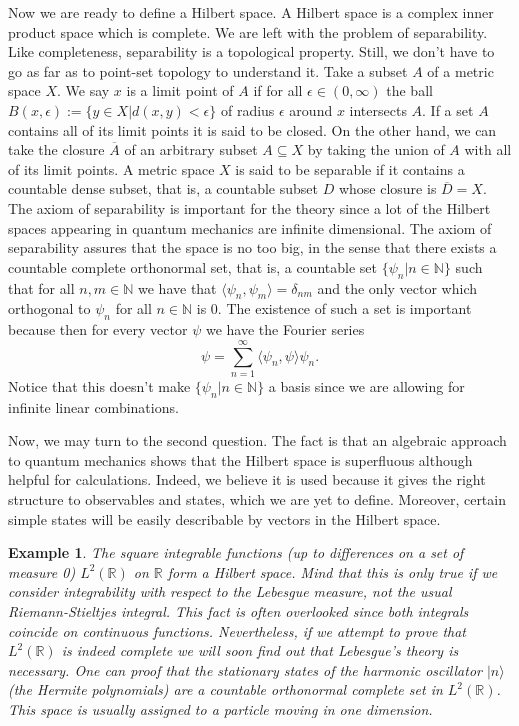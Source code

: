 \documentclass{article}
\newtheorem{example}{Example}
\begin{document}
Now we are ready to define a Hilbert space. A Hilbert space is a complex inner product space which is complete. We are left with the problem of separability. Like completeness, separability is a topological property. Still, we don't have to go as far as to point-set topology to understand it. Take a subset $A$ of a metric space $X$. We say $x$ is a limit point of $A$ if for all $\epsilon\in (0,\infty)$ the ball $B(x,\epsilon):=\{y\in X|d(x,y)<\epsilon\}$ of radius $\epsilon$ around $x$ intersects $A$. If a set $A$ contains all of its limit points it is said to be closed. On the other hand, we can take the closure $\overline{A}$ of an arbitrary subset $A\subseteq X$ by taking the union of $A$ with all of its limit points. A metric space $X$ is said to be separable if it contains a countable dense subset, that is, a countable subset $D$ whose closure is $\overline{D}=X$. The axiom of separability is important for the theory since a lot of the Hilbert spaces appearing in quantum mechanics are infinite dimensional. The axiom of separability assures that the space is no too big, in the sense that there exists a countable complete orthonormal set, that is, a countable set $\{\psi_n|n\in\mathbb{N}\}$ such that for all $n,m\in\mathbb{N}$ we have that $\langle\psi_n,\psi_m\rangle=\delta_{nm}$ and the only vector which orthogonal to $\psi_n$ for all $n\in\mathbb{N}$ is $0$. The existence of such a set is important because then for every vector $\psi$ we have the Fourier series
\begin{equation}
\psi=\sum_{n=1}^\infty \langle \psi_n,\psi\rangle \psi_n.
\end{equation}
Notice that this doesn't make $\{\psi_n|n\in\mathbb{N}\}$ a basis since we are allowing for infinite linear combinations\cite{Hewitt1975}.

Now, we may turn to the second question. The fact is that an algebraic approach to quantum mechanics shows that the Hilbert space is superfluous although helpful for calculations. Indeed, we believe it is used because it gives the right structure to observables and states, which we are yet to define. Moreover, certain simple states will be easily describable by vectors in the Hilbert space.

\begin{example}
The square integrable functions (up to differences on a set of measure 0) $L^2(\mathbb{R})$ on $\mathbb{R}$ form a Hilbert space. Mind that this is only true if we consider integrability with respect to the Lebesgue measure, not the usual Riemann-Stieltjes integral. This fact is often overlooked since both integrals coincide on continuous functions. Nevertheless, if we attempt to prove that $L^2(\mathbb{R})$ is indeed complete we will soon find out that Lebesgue's theory is necessary. One can proof that the stationary states of the harmonic oscillator $|n\rangle$ (the Hermite polynomials) are a countable orthonormal complete set in $L^2(\mathbb{R})$. This space is usually assigned to a particle moving in one dimension.
\end{example}
\end{document}
